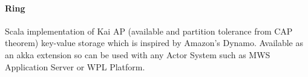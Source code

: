 \paragraph{Ring}
Scala implementation of Kai AP (available and partition tolerance from CAP theorem) key-value storage which is inspired by Amazon's Dynamo.
Available as an akka extension so can be used with any Actor System such as MWS Application Server or WPL Platform.

